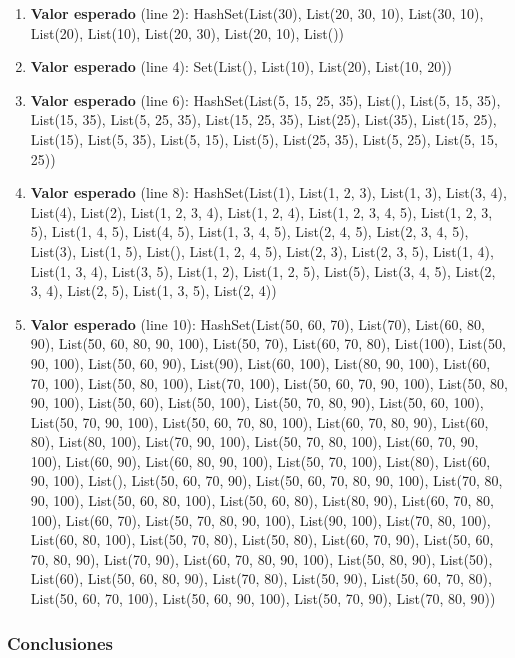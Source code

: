 \documentclass[12pt, a4paper]{article}
\begin{document}
\begin{enumerate}
  \item \textbf{Valor esperado} (line 2): HashSet(List(30), List(20, 30, 10), List(30, 10), List(20), List(10), List(20, 30), List(20, 10), List())
  \item \textbf{Valor esperado} (line 4): Set(List(), List(10), List(20), List(10, 20))
  \item \textbf{Valor esperado} (line 6): HashSet(List(5, 15, 25, 35), List(), List(5, 15, 35), List(15, 35), List(5, 25, 35), List(15, 25, 35), List(25), List(35), List(15, 25), List(15), List(5, 35), List(5, 15), List(5), List(25, 35), List(5, 25), List(5, 15, 25))
  \item \textbf{Valor esperado} (line 8): HashSet(List(1), List(1, 2, 3), List(1, 3), List(3, 4), List(4), List(2), List(1, 2, 3, 4), List(1, 2, 4), List(1, 2, 3, 4, 5), List(1, 2, 3, 5), List(1, 4, 5), List(4, 5), List(1, 3, 4, 5), List(2, 4, 5), List(2, 3, 4, 5), List(3), List(1, 5), List(), List(1, 2, 4, 5), List(2, 3), List(2, 3, 5), List(1, 4), List(1, 3, 4), List(3, 5), List(1, 2), List(1, 2, 5), List(5), List(3, 4, 5), List(2, 3, 4), List(2, 5), List(1, 3, 5), List(2, 4))
  \item \textbf{Valor esperado} (line 10): HashSet(List(50, 60, 70), List(70), List(60, 80, 90), List(50, 60, 80, 90, 100), List(50, 70), List(60, 70, 80), List(100), List(50, 90, 100), List(50, 60, 90), List(90), List(60, 100), List(80, 90, 100), List(60, 70, 100), List(50, 80, 100), List(70, 100), List(50, 60, 70, 90, 100), List(50, 80, 90, 100), List(50, 60), List(50, 100), List(50, 70, 80, 90), List(50, 60, 100), List(50, 70, 90, 100), List(50, 60, 70, 80, 100), List(60, 70, 80, 90), List(60, 80), List(80, 100), List(70, 90, 100), List(50, 70, 80, 100), List(60, 70, 90, 100), List(60, 90), List(60, 80, 90, 100), List(50, 70, 100), List(80), List(60, 90, 100), List(), List(50, 60, 70, 90), List(50, 60, 70, 80, 90, 100), List(70, 80, 90, 100), List(50, 60, 80, 100), List(50, 60, 80), List(80, 90), List(60, 70, 80, 100), List(60, 70), List(50, 70, 80, 90, 100), List(90, 100), List(70, 80, 100), List(60, 80, 100), List(50, 70, 80), List(50, 80), List(60, 70, 90), List(50, 60, 
  70, 80, 90), List(70, 90), List(60, 70, 80, 90, 100), List(50, 80, 90), List(50), List(60), List(50, 60, 80, 90), List(70, 80), List(50, 90), List(50, 60, 70, 80), List(50, 60, 70, 100), List(50, 60, 90, 100), List(50, 70, 90), List(70, 80, 90))
\end{enumerate}
\subsubsection{Conclusiones}
\end{document}
